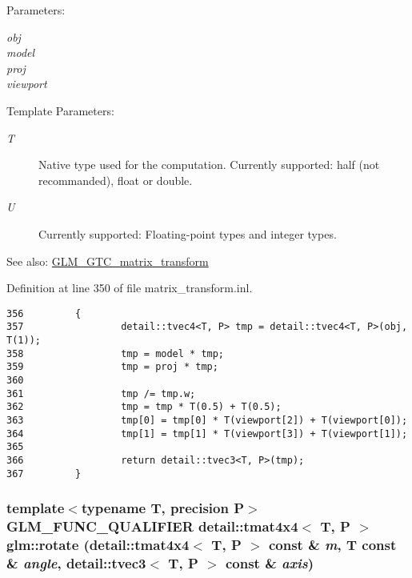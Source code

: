 \begin{Desc}
\item[Parameters:]
\begin{description}
\item[{\em obj}]\item[{\em model}]\item[{\em proj}]\item[{\em viewport}]\end{description}
\end{Desc}
\begin{Desc}
\item[Template Parameters:]
\begin{description}
\item[{\em T}]Native type used for the computation. Currently supported: half (not recommanded), float or double. \item[{\em U}]Currently supported: Floating-point types and integer types. \end{description}
\end{Desc}
\begin{Desc}
\item[See also:]\hyperlink{group__gtc__matrix__transform}{GLM\_\-GTC\_\-matrix\_\-transform} \end{Desc}


Definition at line 350 of file matrix\_\-transform.inl.

\begin{Code}\begin{verbatim}356         {
357                 detail::tvec4<T, P> tmp = detail::tvec4<T, P>(obj, T(1));
358                 tmp = model * tmp;
359                 tmp = proj * tmp;
360 
361                 tmp /= tmp.w;
362                 tmp = tmp * T(0.5) + T(0.5);
363                 tmp[0] = tmp[0] * T(viewport[2]) + T(viewport[0]);
364                 tmp[1] = tmp[1] * T(viewport[3]) + T(viewport[1]);
365 
366                 return detail::tvec3<T, P>(tmp);
367         }
\end{verbatim}
\end{Code}


\hypertarget{group__gtc__matrix__transform_g1a75da872120125437265872423e0b14}{
\subsubsection[rotate]{\setlength{\rightskip}{0pt plus 5cm}template$<$typename T, precision P$>$ GLM\_\-FUNC\_\-QUALIFIER detail::tmat4x4$<$ T, P $>$ glm::rotate (detail::tmat4x4$<$ T, P $>$ const \& {\em m}, \/  T const \& {\em angle}, \/  detail::tvec3$<$ T, P $>$ const \& {\em axis})}}
\label{group__gtc__matrix__transform_g1a75da872120125437265872423e0b14}


